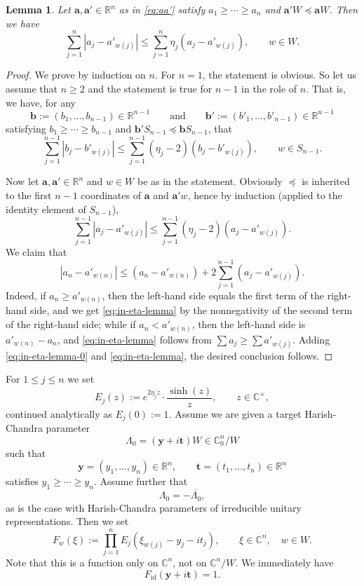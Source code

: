\documentclass[11pt,oneside]{amsart}
\numberwithin{equation}{section}
\theoremstyle{remark}
\theoremstyle{plain}
\newtheorem{lemma}{Lemma}
\newcommand\id{\mathrm{id}}
\newcommand\RR{\mathbb{R}}
\newcommand\CC{\mathbb{C}}
\newcommand{\ba}{\mathbf{a}}
\newcommand{\bb}{\mathbf{b}}
\newcommand{\bt}{\mathbf{t}}
\newcommand{\by}{\mathbf{y}}
\newcommand\ov{\overline}
\renewcommand\leq{\leqslant}
\renewcommand\geq{\geqslant}
\begin{document}
\begin{lemma}\label{lemma:eta} Let $\ba,\ba'\in\RR^n$ as in \eqref{eq:aa'} satisfy $a_1\geq \dotsb \geq a_n$ and $\ba'W\preceq \ba W$. Then we have
\[
\sum_{j=1}^n |a_j-a'_{w(j)}| \leq \sum_{j=1}^n \eta_j (a_j-a'_{w(j)}) ,\qquad w\in W.
\]
\end{lemma}
\begin{proof} We prove by induction on $n$. For $n=1$, the statement is obvious. So let us assume that $n\geq 2$ and the statement is true for $n-1$ in the role of $n$. That is, we have, for any 
\[
\bb:=(b_1,\dotsc,b_{n-1})\in\RR^{n-1} \qquad \text{and} \qquad \bb':=(b'_1,\dotsc,b'_{n-1})\in\RR^{n-1}
\]
satisfying $b_1\geq\dotsb\geq b_{n-1}$ and $\bb'S_{n-1}\preceq \bb S_{n-1}$,
that
\[
\sum_{j=1}^{n-1} |b_j-b'_{w(j)}| \leq \sum_{j=1}^{n-1} (\eta_j-2) (b_j-b'_{w(j)}),\qquad w\in S_{n-1}.
\]

Now let $\ba,\ba'\in\RR^n$ and $w\in W$ be as in the statement. Obviously $\preceq$ is inherited to the first $n-1$ coordinates of $\ba$ and $\ba'w$, hence by induction (applied to the identity element of $S_{n-1}$),
\begin{equation}\label{eq:in-eta-lemma-0}
\sum_{j=1}^{n-1} |a_j-a'_{w(j)}| \leq \sum_{j=1}^{n-1} (\eta_j-2) (a_j-a'_{w(j)}).
\end{equation}
We claim that
\begin{equation}\label{eq:in-eta-lemma}
|a_n-a'_{w(n)}| \leq (a_n-a'_{w(n)}) + 2 \sum_{j=1}^{n-1} (a_j-a'_{w(j)}).
\end{equation}
Indeed, if $a_n\geq a'_{w(n)}$, then the left-hand side equals the first term of the right-hand side, and we get \eqref{eq:in-eta-lemma} by the nonnegativity of the second term of the right-hand side; while if $a_n<a'_{w(n)}$, then the left-hand side is $a'_{w(n)}-a_n$, and \eqref{eq:in-eta-lemma} follows from $\sum a_j\geq \sum a'_{w(j)}$. Adding \eqref{eq:in-eta-lemma-0} and \eqref{eq:in-eta-lemma}, the desired conclusion follows.
\end{proof}

For $1\leq j\leq n$ we set
\begin{equation}\label{eq:E-def}
E_{j}(z):=e^{2\eta_j z} \cdot \frac{\sinh(z)}{z},\qquad z\in\CC^{\times},
\end{equation}
continued analytically as $E_j(0):=1$. Assume we are given a target Harish-Chandra parameter
\[
\Lambda_0=(\by+i\bt)W \in \CC^n_0/W
\]
such that
\[\by=(y_1,\dotsc,y_n)\in\RR^n,\qquad\bt=(t_1,\dotsc,t_n)\in\RR^n\]
satisfies $y_1\geq\dotsb\geq y_n$. Assume further that
\begin{equation}\label{eq:selfdual}
\Lambda_0=-\ov{\Lambda_0},
\end{equation}
as is the case with Harish-Chandra parameters of irreducible unitary representations. Then we set
\begin{equation}\label{eq:F_w-def}
F_w(\xi):=\prod_{j=1}^n E_{j}(\xi_{w(j)}-y_j-it_j),\qquad \xi\in\CC^n,\quad w\in W.
\end{equation}
Note that this is a function only on $\CC^n$, not on $\CC^n/W$. We immediately have
\begin{equation}\label{eq:F_id=1}
F_{{\id}}(\by+i\bt)=1.
\end{equation}
\end{document}
